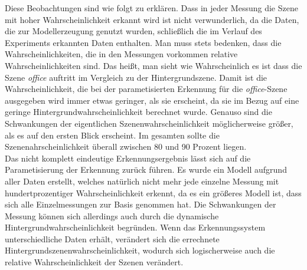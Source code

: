 Diese Beobachtungen sind wie folgt zu erklären. Dass in jeder Messung die Szene mit hoher Wahrscheinlichkeit erkannt wird ist nicht verwunderlich, da die Daten, die zur Modellerzeugung genutzt wurden, schließlich die im Verlauf des Experiments erkannten Daten enthalten. Man muss stets bedenken, dass die Wahrscheinlichkeiten, die in den Messungen vorkommen relative Wahrscheinlichkeiten sind. Das heißt, man sieht wie Wahrscheinlich es ist dass die Szene \textit{office} auftritt im Vergleich zu der Hintergrundszene. Damit ist die Wahrscheinlichkeit, die  bei der parametisierten Erkennung für die \textit{office}-Szene ausgegeben wird immer etwas geringer, als sie erscheint, da sie im Bezug auf eine geringe Hintergrundwahrscheinlichkeit berechnet wurde. Genauso sind die Schwankungen der eigentlichen Szenenwahrscheinlichkeit möglicherweise größer, als es auf den ersten Blick erscheint. Im gesamten sollte die Szenenahrscheinlichkeit überall zwischen 80 und 90 Prozent liegen.\smallskip\\
Das nicht komplett eindeutige Erkennungsergebnis lässt sich auf die Parametisierung der Erkennung zurück führen. Es wurde ein Modell aufgrund aller Daten erstellt, welches natürlich nicht mehr jede einzelne Messung mit hundertprozentiger Wahrscheinlichkeit erkennt, da es ein größeres Modell ist, dass sich alle Einzelmessungen zur Basis genommen hat. Die Schwankungen der Messung können sich allerdings auch durch die dynamische Hintergrundwahrscheinlichkeit begründen. Wenn das Erkennungssystem unterschiedliche Daten erhält, verändert sich die errechnete Hintergrundszenenwahrscheinlichkeit, wodurch sich logischerweise auch die relative Wahrscheinlichkeit der Szenen verändert.\smallskip\\
